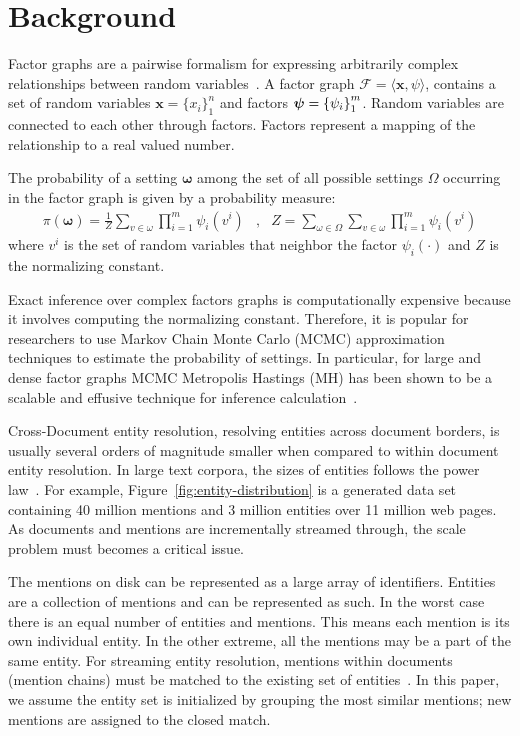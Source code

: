 
\section{Background}
\label{sec:optimizer:background}

Factor graphs
are a pairwise formalism for expressing arbitrarily complex
relationships between random variables~\cite{koller2009probabilistic}.
A factor graph $\mathcal{F} = \langle \textbf{x}, \psi \rangle$, contains a set of random
variables $ \textbf{x} = {\{x_i \}}^n_1$ and
factors ${\textbf{\boldmath$\psi$\unboldmath}} = { \{\psi_i\} }^m_1 $.
Random variables are connected to each other through factors.
Factors represent a mapping of the relationship to a real valued number.

The probability of a setting $\mathbf{\omega}$ among the set of all possible
settings $\Omega$ occurring in the factor graph is given by a probability measure:
\begin{align*}
\pi(\mathbf{\omega}) = \frac{1}{Z} \sum_{v \in \omega} \prod_{i=1}^{m} \psi_i(v^i) &,&  Z = \sum_{\omega \in \Omega} \sum_{v \in \omega}  \prod_{i=1}^{m} \psi_i(v^i) 
\end{align*}
where $v^i$ is the set of random variables that neighbor the factor
$\psi_{i}(\cdot)$ and $Z$ is the normalizing constant.


Exact inference over complex factors graphs is computationally expensive
because it involves computing the normalizing constant.
Therefore, it is popular for researchers to use Markov Chain Monte Carlo (MCMC) 
approximation techniques to estimate the probability of settings.
In particular, for large and dense factor graphs MCMC Metropolis Hastings (MH) has
been shown to be a scalable and effusive technique for 
inference calculation~\cite{singh2011large}.

Cross-Document entity resolution, resolving entities across document borders,
is usually several orders of magnitude smaller when compared to within document entity resolution.
In large text corpora, the sizes of entities follows the power law~\cite{singh12:wiki-links}.
For example, Figure~\ref{fig:entity-distribution} is a generated data set containing
40 million mentions and 3 million entities over 11 million web pages.
As documents and mentions are incrementally streamed through,
the scale problem must becomes a critical issue.

The mentions on disk can be represented as a large array of identifiers.
Entities are a collection of mentions and can be represented as such.
In the worst case there is an equal number of entities and mentions.
This means each mention is its own individual entity.
In the other extreme, all the mentions may be a part of the same entity.
For streaming entity resolution, mentions within documents (mention chains)
must be matched to the existing set of entities~\cite{rao2010streaming}.
In this paper, we assume the entity set is initialized by grouping the most
similar mentions; new mentions are assigned to the closed match.

